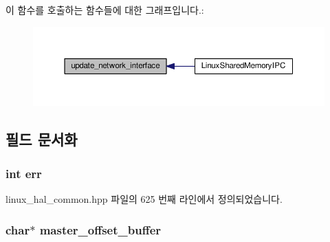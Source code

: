 이 함수를 호출하는 함수들에 대한 그래프입니다.\+:
\nopagebreak
\begin{figure}[H]
\begin{center}
\leavevmode
\includegraphics[width=350pt]{class_linux_shared_memory_i_p_c_ad971ad6fa412e49d34a5ca927815e715_icgraph}
\end{center}
\end{figure}




\subsection{필드 문서화}
\subsubsection[{\texorpdfstring{err}{err}}]{\setlength{\rightskip}{0pt plus 5cm}int err\hspace{0.3cm}{\ttfamily [private]}}\hypertarget{class_linux_shared_memory_i_p_c_a6ce68847c12434f60d1b2654a3dc3409}{}\label{class_linux_shared_memory_i_p_c_a6ce68847c12434f60d1b2654a3dc3409}


linux\+\_\+hal\+\_\+common.\+hpp 파일의 625 번째 라인에서 정의되었습니다.

\subsubsection[{\texorpdfstring{master\+\_\+offset\+\_\+buffer}{master_offset_buffer}}]{\setlength{\rightskip}{0pt plus 5cm}char$\ast$ master\+\_\+offset\+\_\+buffer\hspace{0.3cm}{\ttfamily [private]}}\hypertarget{class_linux_shared_memory_i_p_c_a028459163bd8b988344f6837036cb0be}{}\label{class_linux_shared_memory_i_p_c_a028459163bd8b988344f6837036cb0be}


